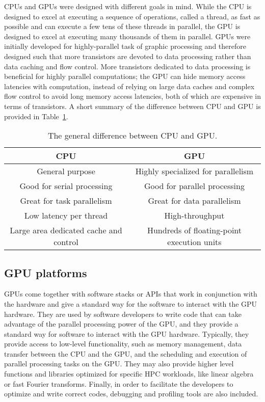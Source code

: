 \par
CPUs and GPUs were designed with different goals in mind.
While the CPU is designed to excel at executing a sequence of operations, called a thread, as fast as possible and can execute a few tens of these threads in parallel, the GPU is designed to excel at executing many thousands of them in parallel.
GPUs were initially developed for highly-parallel task of graphic processing and therefore designed such that more transistors are devoted to data processing rather than data caching and flow control.
More transistors dedicated to data processing is beneficial for highly parallel computations; the GPU can hide memory access latencies with computation, instead of relying on large data caches and complex flow control to avoid long memory access latencies, both of which are expensive in terms of transistors.
A short summary of the difference between CPU and GPU is provided in Table~\ref{tbl:difference_cpu_gpu}.


\begin{table}[!h]
\centering\caption{The general difference between CPU and GPU.}\label{tbl:difference_cpu_gpu}
\begin{tabular}{ |c|c| }
\hline
\textbf{CPU} & \textbf{GPU} \\
\hline
General purpose & Highly specialized for parallelism \\ 
Good for serial processing & Good for parallel processing \\ 
Great for task parallelism & Great for data parallelism \\ 
Low latency per thread & High-throughput \\
Large area dedicated cache and control & Hundreds of floating-point execution units \\
\hline
\end{tabular}
\end{table}




\subsection{GPU platforms}


\par
GPUs come together with software stacks or APIs that work in conjunction with the hardware and give a standard way for the software to interact with the GPU hardware.
They are used by software developers to write code that can take advantage of the parallel processing power of the GPU, and they provide a standard way for software to interact with the GPU hardware.
Typically, they provide access to low-level functionality, such as memory management, data transfer between the CPU and the GPU, and the scheduling and execution of parallel processing tasks on the GPU.
They may also provide higher level functions and libraries optimized for specific HPC workloads, like linear algebra or fast Fourier transforms. 
Finally, in order to facilitate the developers to optimize and write correct codes, debugging and profiling tools are also included.


